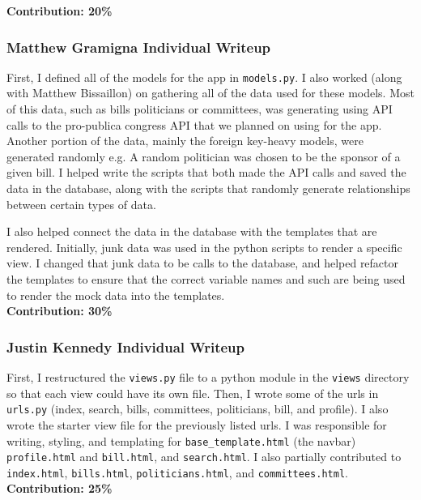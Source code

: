 \documentclass{article}
\newcommand{\n}{\noindent}
\begin{document}
\n\textbf{Contribution: 20\%}
\pagebreak

\subsubsection*{Matthew Gramigna Individual Writeup}

First, I defined all of the models for the app in \verb|models.py|. I also worked (along with Matthew Bissaillon) on gathering all of the data used for these models. Most of this data, such as bills politicians or committees, was generating using API calls to the pro-publica congress API that we planned on using for the app.  Another portion of the data, mainly the foreign key-heavy models, were generated randomly e.g. A random politician was chosen to be the sponsor of a given bill. I helped write the scripts that both made the API calls and saved the data in the database, along with the scripts that randomly generate relationships between certain types of data.

I also helped connect the data in the database with the templates that are rendered. Initially, junk data was used in the python scripts to render a specific view. I changed that junk data to be calls to the database, and helped refactor the templates to ensure that the correct variable names and such are being used to render the mock data into the templates. \\

\n\textbf{Contribution: 30\%} 

\pagebreak

\subsubsection*{Justin Kennedy Individual Writeup}

First, I restructured the \verb|views.py| file to a python module in the \verb|views| directory so that each view could have its own file.  Then, I wrote some of the urls in \verb|urls.py| (index, search, bills, committees, politicians, bill, and profile).  I also wrote the starter view file for the previously listed urls.  I was responsible for writing, styling, and templating for \verb|base_template.html| (the navbar) \verb|profile.html| and \verb|bill.html|, and \verb|search.html|.  I also partially contributed to \verb|index.html|, \verb|bills.html|, \verb|politicians.html|, and \verb|committees.html|.\\

\n\textbf{Contribution: 25\%}
\end{document}
